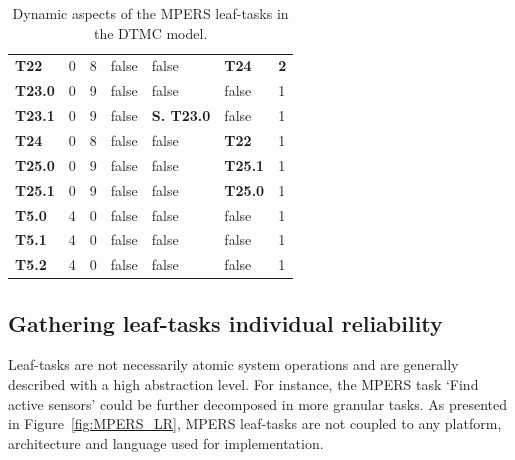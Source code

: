 \begin{table}[ht!]
{\begin{tabularx}{\textwidth}{@{}lllllll@{}}
\textbf{T22}   & 0                  & 8                  & false             & false                & \textbf{T24}                  & \textbf{2}  \\
\textbf{T23.0} & 0                  & 9                  & false             & false                & false                  & 1           \\
\textbf{T23.1} & 0                  & 9                  & false             & \textbf{S. T23.0}   & false                  & 1           \\
\textbf{T24}   & 0                  & 8                  & false             & false                & \textbf{T22}                  & 1           \\
\textbf{T25.0} & 0                  & 9                  & false             & false                & \textbf{T25.1                 } & 1           \\
\textbf{T25.1} & 0                  & 9                  & false             & false                & \textbf{T25.0}                  & 1           \\
\textbf{T5.0} & 4                   & 0                  & false             & false                & false                & 1           \\
\textbf{T5.1} & 4                   & 0                  & false             & false                & false                & 1           \\
\textbf{T5.2} & 4                   & 0                  & false             & false                & false                & 1           \\ \bottomrule
\end{tabularx}
\caption{Dynamic aspects of the MPERS leaf-tasks in the DTMC model.}
\label{tab:MPERS_DTMC_SLOTS}
}
\end{table}


\subsection{Gathering leaf-tasks individual reliability}

Leaf-tasks are not necessarily atomic system operations and are generally described with a high abstraction level. For instance, the MPERS task `Find active sensors' could be further decomposed in more granular tasks. As presented in Figure~\ref{fig:MPERS_LR}, MPERS leaf-tasks are not coupled to any platform, architecture and language used for implementation.


